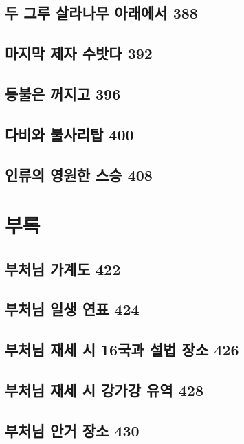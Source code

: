 \documentclass[12pt, a4paper, oneside]{book}
\let\stdsection\section
\renewcommand\section{\newpage\stdsection}
\begin{document}
	\section{두 그루 살라나무 아래에서 388 }

	\section{마지막 제자 수밧다 392 }

	\section{등불은 꺼지고 396 }

	\section{다비와 불사리탑 400 }

	\section{인류의 영원한 스승 408}


	\chapter{부록}
	\noptcrule
	\parttoc				


	\section{부처님 가계도 422}


	\section{부처님 일생 연표 424 }

	\section{부처님 재세 시 16국과 설법 장소 426}


	\section{부처님 재세 시 강가강 유역 428 }

	\section{부처님 안거 장소 430 }
\end{document}
